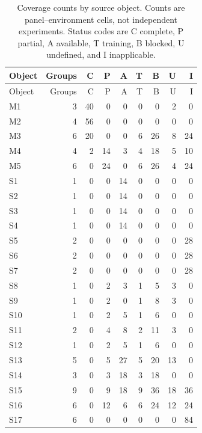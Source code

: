 \begingroup
\normalsize
\renewcommand{\arraystretch}{1.10}
\begin{longtable}{@{}lrrrrrrrr@{}}
\caption{Coverage counts by source object. Counts are panel--environment cells, not independent experiments. Status codes are C complete, P partial, A available, T training, B blocked, U undefined, and I inapplicable.}\label{tab:object-counts}\\
\toprule
Object & Groups & C & P & A & T & B & U & I \\
\midrule\endfirsthead
\toprule Object & Groups & C & P & A & T & B & U & I \\ \midrule\endhead
M1 & 3 & 40 & 0 & 0 & 0 & 0 & 2 & 0 \\
M2 & 4 & 56 & 0 & 0 & 0 & 0 & 0 & 0 \\
M3 & 6 & 20 & 0 & 0 & 6 & 26 & 8 & 24 \\
M4 & 4 & 2 & 14 & 3 & 4 & 18 & 5 & 10 \\
M5 & 6 & 0 & 24 & 0 & 6 & 26 & 4 & 24 \\
S1 & 1 & 0 & 0 & 14 & 0 & 0 & 0 & 0 \\
S2 & 1 & 0 & 0 & 14 & 0 & 0 & 0 & 0 \\
S3 & 1 & 0 & 0 & 14 & 0 & 0 & 0 & 0 \\
S4 & 1 & 0 & 0 & 14 & 0 & 0 & 0 & 0 \\
S5 & 2 & 0 & 0 & 0 & 0 & 0 & 0 & 28 \\
S6 & 2 & 0 & 0 & 0 & 0 & 0 & 0 & 28 \\
S7 & 2 & 0 & 0 & 0 & 0 & 0 & 0 & 28 \\
S8 & 1 & 0 & 2 & 3 & 1 & 5 & 3 & 0 \\
S9 & 1 & 0 & 2 & 0 & 1 & 8 & 3 & 0 \\
S10 & 1 & 0 & 2 & 5 & 1 & 6 & 0 & 0 \\
S11 & 2 & 0 & 4 & 8 & 2 & 11 & 3 & 0 \\
S12 & 1 & 0 & 2 & 5 & 1 & 6 & 0 & 0 \\
S13 & 5 & 0 & 5 & 27 & 5 & 20 & 13 & 0 \\
S14 & 3 & 0 & 3 & 18 & 3 & 18 & 0 & 0 \\
S15 & 9 & 0 & 9 & 18 & 9 & 36 & 18 & 36 \\
S16 & 6 & 0 & 12 & 6 & 6 & 24 & 12 & 24 \\
S17 & 6 & 0 & 0 & 0 & 0 & 0 & 0 & 84 \\
\bottomrule
\end{longtable}
\endgroup

